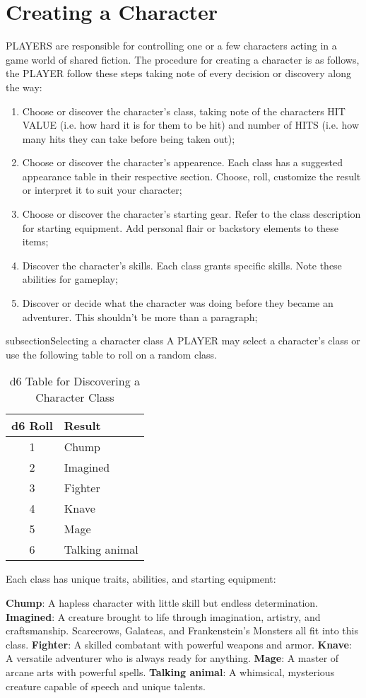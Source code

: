 \section{Creating a Character}
PLAYERS are responsible for controlling one or a few characters acting in a game world of shared fiction. The procedure for creating a character is as follows, the PLAYER follow these steps taking note of every decision or discovery along the way:
\begin{enumerate}
  \item {Choose or discover the character's class, taking note of the characters HIT VALUE (i.e. how hard it is for them to be hit) and number of HITS (i.e. how many hits they can take before being taken out);}
  \item {Choose or discover the character's appearence. Each class has a suggested appearance table in their respective section. Choose, roll, customize the result or interpret it to suit your character;}
  \item {Choose or discover the character's starting gear. Refer to the class description for starting equipment. Add personal flair or backstory elements to these items;}
  \item {Discover the character's skills. Each class grants specific skills. Note these abilities for gameplay;}
  \item {Discover or decide what the character was doing before they became an adventurer. This shouldn't be more than a paragraph;}
\end{enumerate}

subsection{Selecting a character class}
A PLAYER may select a character's class or use the following table to roll on a random class.
\begin{table}[h!]
\centering
\begin{tabular}{|c|l|}
\hline
\textbf{d6 Roll} & \textbf{Result} \\
\hline
1 & Chump \\
2 & Imagined \\
3 & Fighter \\
4 & Knave \\
5 & Mage \\
6 & Talking animal \\
\hline
\end{tabular}
\caption{d6 Table for Discovering a Character Class}
\label{tab:d6_character_table}
\end{table}

Each class has unique traits, abilities, and starting equipment:
\begin{itemize}
\textbf{Chump}: A hapless character with little skill but endless determination.
\textbf{Imagined}: A creature brought to life through imagination, artistry, and craftsmanship. Scarecrows, Galateas, and Frankenstein's Monsters all fit into this class.
\textbf{Fighter}: A skilled combatant with powerful weapons and armor.
\textbf{Knave}: A versatile adventurer who is always ready for anything.
\textbf{Mage}: A master of arcane arts with powerful spells.
\textbf{Talking animal}: A whimsical, mysterious creature capable of speech and unique talents.
\end{itemize}
